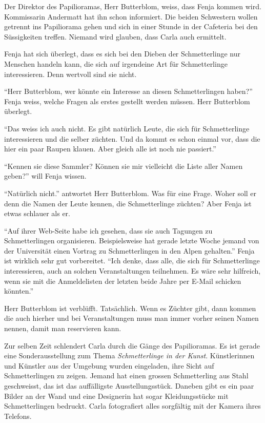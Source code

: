 Der Direktor des Papilioramas, Herr Butterblom, weiss, dass Fenja kommen wird. Kommissarin Andermatt hat ihn schon informiert. Die beiden Schwestern wollen getrennt ins Papiliorama gehen und sich in einer Stunde in der Cafeteria bei den Süssigkeiten treffen. Niemand wird glauben, dass Carla auch ermittelt.

Fenja hat sich überlegt, dass es sich bei den Dieben der Schmetterlinge nur Menschen handeln kann, die sich auf irgendeine Art für Schmetterlinge interessieren. Denn wertvoll sind sie nicht. 

\enquote{Herr Butterblom, wer könnte ein Interesse an diesen Schmetterlingen haben?} Fenja weiss, welche Fragen als erstes gestellt werden müssen. Herr Butterblom überlegt.

\enquote{Das weiss ich auch nicht. Es gibt natürlich Leute, die sich für Schmetterlinge interessieren und die selber züchten. Und da kommt es schon einmal vor, dass die hier ein paar Raupen klauen. Aber gleich alle ist noch nie passiert.} 

\enquote{Kennen sie diese Sammler? Können sie mir vielleicht die Liste aller Namen geben?} will Fenja wissen.

\enquote{Natürlich nicht.} antwortet Herr Butterblom. Was für eine Frage. Woher soll er denn die Namen der Leute kennen, die Schmetterlinge züchten? Aber Fenja ist etwas schlauer als er.

\enquote{Auf ihrer Web-Seite habe ich gesehen, dass sie auch Tagungen zu Schmetterlingen organisieren. Beispielsweise hat gerade letzte Woche jemand von der Universität einen Vortrag zu Schmetterlingen in den Alpen gehalten.} Fenja ist wirklich sehr gut vorbereitet. \enquote{Ich denke, dass alle, die sich für Schmetterlinge interessieren, auch an solchen Veranstaltungen teilnehmen. Es wäre sehr hilfreich, wenn sie mit die Anmeldelisten der letzten beide Jahre per E-Mail schicken könnten.}

Herr Butterblom ist verblüfft. Tatsächlich. Wenn es Züchter gibt, dann kommen die auch hierher und bei Veranstaltungen muss man immer vorher seinen Namen nennen, damit man reservieren kann. 
\begin{center}
\aldineleft
\end{center}

Zur selben Zeit schlendert Carla durch die Gänge des Papilioramas. Es ist gerade eine Sonderausstellung zum Thema \emph{Schmetterlinge in der Kunst}. Künstlerinnen und Künstler aus der Umgebung wurden eingeladen, ihre Sicht auf Schmetterlingen zu zeigen. Jemand hat einen grossen Schmetterling aus Stahl geschweisst, das ist das auffälligste Ausstellungsstück. Daneben gibt es ein paar Bilder an der Wand und eine Designerin hat sogar Kleidungsstücke mit Schmetterlingen bedruckt. Carla fotografiert alles sorgfältig mit der Kamera ihres Telefons.

